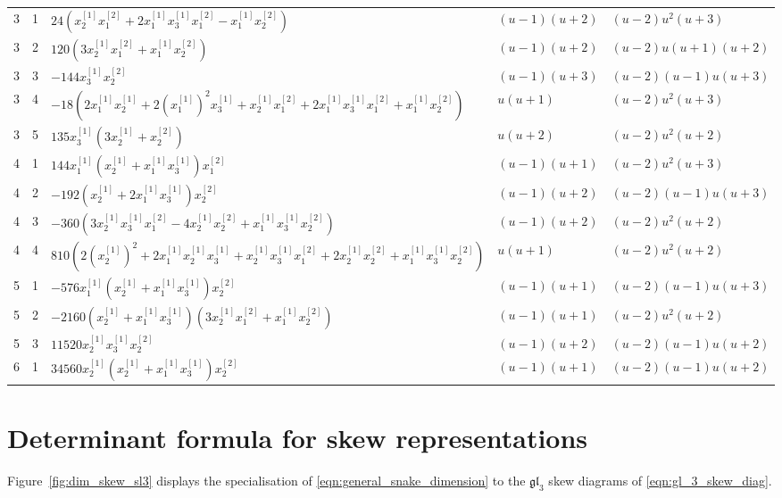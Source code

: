 \documentclass[12pt,reqno]{amsart}
\numberwithin{equation}{section}
\begin{document}
{\begin{longtable}{c c >{\raggedright\arraybackslash}p{8.2cm} >{\raggedright\arraybackslash}p{2.2cm} >{\raggedright\arraybackslash}p{3.0cm}}
	3 & 1 & $24(x_2^{[1]}x_1^{[2]}+2x_1^{[1]}x_3^{[1]}x_1^{[2]}-x_1^{[1]}x_2^{[2]})$ & $(u-1)(u+2)$ & $(u-2)u^2(u+3)$\\
	3 & 2 & $120(3x_2^{[1]}x_1^{[2]}+x_1^{[1]}x_2^{[2]})$ & $(u-1)(u+2)$ & $(u-2)u(u+1)(u+2)$\\
	3 & 3 & $-144x_3^{[1]}x_2^{[2]}$ & $(u-1)(u+3)$ & $(u-2)(u-1)u(u+3)$\\
	3 & 4 & $-18(2x_1^{[1]}x_2^{[1]}+2(x_1^{[1]})^2x_3^{[1]}+x_2^{[1]}x_1^{[2]}+2x_1^{[1]}x_3^{[1]}x_1^{[2]}+x_1^{[1]}x_2^{[2]})$ & $u(u+1)$ & $(u-2)u^2(u+3)$\\
	3 & 5 & $135x_3^{[1]}(3x_2^{[1]}+x_2^{[2]})$ & $u(u+2)$ & $(u-2)u^2(u+2)$\\
	4 & 1 & $144x_1^{[1]}(x_2^{[1]}+x_1^{[1]}x_3^{[1]})x_1^{[2]}$ & $(u-1)(u+1)$ & $(u-2)u^2(u+3)$\\
	4 & 2 & $-192(x_2^{[1]}+2x_1^{[1]}x_3^{[1]})x_2^{[2]}$ & $(u-1)(u+2)$ & $(u-2)(u-1)u(u+3)$\\
	4 & 3 & $-360(3x_2^{[1]}x_3^{[1]}x_1^{[2]}-4x_2^{[1]}x_2^{[2]}+x_1^{[1]}x_3^{[1]}x_2^{[2]})$ & $(u-1)(u+2)$ & $(u-2)u^2(u+2)$\\
	4 & 4 & $810(2(x_2^{[1]})^2+2x_1^{[1]}x_2^{[1]}x_3^{[1]}+x_2^{[1]}x_3^{[1]}x_1^{[2]}+2x_2^{[1]}x_2^{[2]}+x_1^{[1]}x_3^{[1]}x_2^{[2]})$ & $u(u+1)$ & $(u-2)u^2(u+2)$\\
	5 & 1 & $-576x_1^{[1]}(x_2^{[1]}+x_1^{[1]}x_3^{[1]})x_2^{[2]}$ & $(u-1)(u+1)$ & $(u-2)(u-1)u(u+3)$\\
	5 & 2 & $-2160(x_2^{[1]}+x_1^{[1]}x_3^{[1]})(3x_2^{[1]}x_1^{[2]}+x_1^{[1]}x_2^{[2]})$ & $(u-1)(u+1)$ & $(u-2)u^2(u+2)$\\
	5 & 3 & $11520x_2^{[1]}x_3^{[1]}x_2^{[2]}$ & $(u-1)(u+2)$ & $(u-2)(u-1)u(u+2)$\\
	6 & 1 & $34560x_2^{[1]}(x_2^{[1]}+x_1^{[1]}x_3^{[1]})x_2^{[2]}$ & $(u-1)(u+1)$ & $(u-2)(u-1)u(u+2)$\\
	\end{longtable}
	}

	\clearpage
	\section{Determinant formula for skew representations}
	\label{app:skew_dimension_determinant}
	Figure~\ref{fig:dim_skew_sl3} displays the specialisation of
	\eqref{eqn:general_snake_dimension} to the $\mathfrak{gl}_3$ skew
	diagrams of \eqref{eqn:gl_3_skew_diag}.
\end{document}

